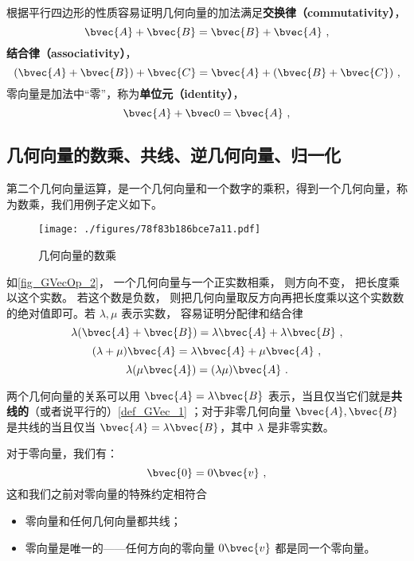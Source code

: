 根据平行四边形的性质容易证明几何向量的加法满足\textbf{交换律（commutativity）}，
\begin{equation}
\bvec{A} + \bvec{B} = \bvec{B} + \bvec{A}~,
\end{equation}
\textbf{结合律（associativity）}，
\begin{equation}
(\bvec{A} + \bvec{B}) + \bvec{C} = \bvec{A} + (\bvec{B} + \bvec{C})~,
\end{equation}
零向量是加法中“零”，称为\textbf{单位元（identity）}，
\begin{equation}
\bvec{A} + \bvec 0 = \bvec{A}~,
\end{equation}

\subsection{几何向量的数乘、共线、逆几何向量、归一化}\label{sub_GVecOp_1}
第二个几何向量运算，是一个几何向量和一个数字的乘积，得到一个几何向量，称为数乘，我们用例子定义如下。

\begin{figure}[ht]
\centering
\texttt{[image: ./figures/78f83b186bce7a11.pdf]}
\caption{几何向量的数乘} \label{fig_GVecOp_2}
\end{figure}

如\autoref{fig_GVecOp_2}， 一个几何向量与一个正实数相乘， 则方向不变， 把长度乘以这个实数。 若这个数是负数， 则把几何向量取反方向再把长度乘以这个实数数的绝对值即可。若 $\lambda, \mu$ 表示实数， 容易证明分配律和结合律
\begin{equation}
\lambda(\bvec{A} + \bvec{B}) = \lambda\bvec{A} + \lambda\bvec{B}~,
\end{equation}
\begin{equation}
(\lambda+\mu)\bvec{A} = \lambda\bvec{A} + \mu\bvec{A}~,
\end{equation}
\begin{equation}
\lambda(\mu\bvec{A}) = (\lambda\mu) \bvec{A}~.
\end{equation}

两个几何向量的关系可以用 $\bvec{A} = \lambda\bvec{B}$ 表示，当且仅当它们就是\textbf{共线的}（或者说平行的）\autoref{def_GVec_1} ；对于非零几何向量 $\bvec{A}, \bvec{B}$ 是共线的当且仅当 $\bvec{A} = \lambda\bvec{B}$，其中 $\lambda$ 是非零实数。

对于零向量，我们有：
\begin{equation}
\bvec{0} = 0 \bvec{v}~,
\end{equation}
这和我们之前对零向量的特殊约定相符合
\begin{itemize}
\item 零向量和任何几何向量都共线；
\item 零向量是唯一的——任何方向的零向量 $0 \bvec{v}$ 都是同一个零向量。
\end{itemize}

